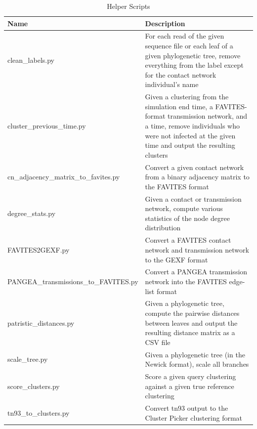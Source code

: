 \begin{table}[!ht] %
\caption[Helper Scripts]{Helper Scripts}
\vspace{-0.25in}
\begin{center}
\begin{tabular}{|P{2.75in}|P{3.25in}|}
\hline
\textbf{Name} & \textbf{Description}  \\
\hline
clean\_labels.py & For each read of the given sequence file or each leaf of a given phylogenetic tree, remove everything from the label except for the contact network individual's name \\
\hline
cluster\_previous\_time.py & Given a clustering from the simulation end time, a FAVITES-format transmission network, and a time, remove individuals who were not infected at the given time and output the resulting clusters \\
\hline
cn\_adjacency\_matrix\_to\_favites.py & Convert a given contact network from a binary adjacency matrix to the FAVITES format \\
\hline
degree\_stats.py & Given a contact or transmission network, compute various statistics of the node degree distribution \\
\hline
FAVITES2GEXF.py & Convert a FAVITES contact network and transmission network to the GEXF format \\
\hline
PANGEA\_transmissions\_to\_FAVITES.py & Convert a PANGEA transmission network into the FAVITES edge-list format \\
\hline
patristic\_distances.py & Given a phylogenetic tree, compute the pairwise distances between leaves and output the resulting distance matrix as a CSV file \\
\hline
scale\_tree.py & Given a phylogenetic tree (in the Newick format), scale all branches \\
\hline
score\_clusters.py & Score a given query clustering against a given true reference clustering \\
\hline
tn93\_to\_clusters.py & Convert tn93 output to the Cluster Picker clustering format \\
\hline
\end{tabular}
\end{center}
\label{tab:favites-helper}
\end{table}

